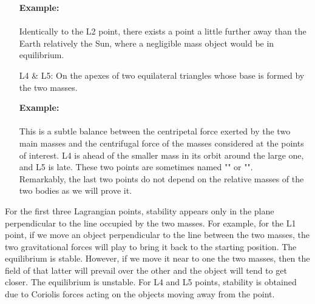 \begin{enumerate}
		\begin{tcolorbox}[colframe=black,colback=white,sharp corners]
		\textbf{{\Large {}}Example:}\\\\
		Identically to the L2 point, there exists a point a little further away than the Earth relatively the Sun, where a negligible mass object would be in equilibrium.
		\end{tcolorbox}
		

		\item[L4 \& L5:] On the apexes of two equilateral triangles whose base is formed by the two masses.
		
		\begin{tcolorbox}[colframe=black,colback=white,sharp corners]
		\textbf{{\Large {}}Example:}\\\\
		This is a subtle balance between the centripetal force exerted by the two main masses and the centrifugal force of the masses considered at the points of interest. L4 is ahead of the smaller mass in its orbit around the large one, and L5 is late. These two points are sometimes named "" or "".\\

	Remarkably, the last two points do not depend on the relative masses of the two bodies as we will prove it.
		\end{tcolorbox}

	\end{enumerate}
	For the first three Lagrangian points, stability appears only in the plane perpendicular to the line occupied by the two masses. For example, for the L1 point, if we move an object perpendicular to the line between the two masses, the two gravitational forces will play to bring it back to the starting position. The equilibrium is stable. However, if we move it near to one the two masses, then the field of that latter will prevail over the other and the object will tend to get closer. The equilibrium is unstable. For L4 and L5 points, stability is obtained due to Coriolis forces acting on the objects moving away from the point.
	
